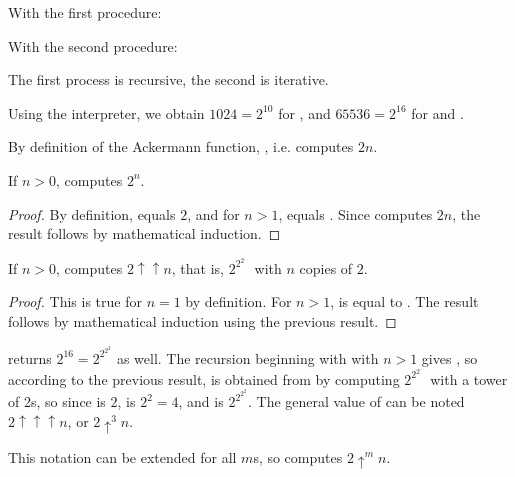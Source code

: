 \begin{exe} %
    With the first procedure:

    With the second procedure:

    The first process is recursive, the second is iterative.
\end{exe}

\begin{exe} %
    Using the interpreter, we obtain $1024 = 2^{10}$ for , and 
    $65536 = 2^{16}$ for  and .

    By definition of the Ackermann function, , i.e.
     computes $2n$.

    \medskip

    If $n > 0$,  computes $2^n$.

    \begin{proof}
        By definition,  equals $2$, and for $n > 1$,  
        equals . Since  computes $2n$,
        the result follows by mathematical induction.
    \end{proof}

    \medskip

    If $n > 0$,  computes $2 \uparrow \uparrow n$, that is, 
    $2^{2^{2^{…}}}$ with $n$ copies of $2$.

    \begin{proof}
        This is true for $n = 1$ by definition. For $n > 1$,  is 
        equal to\linebreak
        . The result follows by mathematical induction 
        using the previous result.
    \end{proof}

    \medskip

    \begin{remark}
         returns $2^{16} = 2^{2^{2^2}}$ as well. The recursion 
        beginning with  with\linebreak
        $n > 1$ gives , so according to the previous 
        result,  is obtained from  by 
        computing $2^{2^{2^{…}}}$ with a tower of
         2s, so since  is $2$,  
        is $2^2 = 4$, and  is $2^{2^{2^2}}$. The general value of 
         can be noted $2 \uparrow \uparrow \uparrow n$, or $2 
        \uparrow^3 n$.

        This notation can be extended for all $m$s, so  computes 
        $2 \uparrow^m n$.
    \end{remark}
\end{exe}

